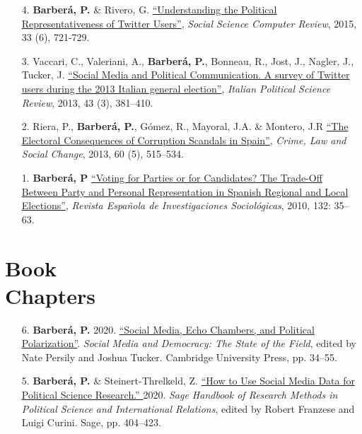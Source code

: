 \documentclass[margin,line,11pt]{resume}
\begin{document}
\begin{resume}
\begin{itemize}[leftmargin=5.5mm]
\item[4.] \textbf{Barber\'{a}, P.} \& Rivero, G. \href{http://ssc.sagepub.com/content/33/6/712}{``Understanding the Political Representativeness of Twitter Users''}, \textit{Social Science Computer Review}, 2015, 33 (6), 721-729.

\newpage 

\item[3.] Vaccari, C., Valeriani, A., \textbf{Barber\'{a}, P.}, Bonneau, R., Jost, J., Nagler, J., Tucker, J. \href{http://www.rivisteweb.it/doi/10.1426/75245}{``Social Media and Political Communication. A survey of Twitter users during the 2013 Italian general election''}, \emph{Italian Political Science Review}, 2013, 43 (3), 381--410.

\item[2.] Riera, P., \textbf{Barber\'{a}, P.}, G\'{o}mez, R., Mayoral, J.A. \& Montero, J.R \href{http://link.springer.com/article/10.1007/s10611-013-9479-1}{``The Electoral Consequences of Corruption Scandals in Spain''}, \emph{Crime, Law and Social Change}, 2013, 60 (5), 515--534.

\item[1.] \textbf{Barber\'{a}, P} \href{http://www.reis.cis.es/REIS/PDF/REIS_132_021285919804928.pdf}{``Voting for Parties or for Candidates? The Trade-Off Between Party and Personal Representation in Spanish Regional and Local Elections''}, \emph{Revista Espa\~{n}ola de Investigaciones Sociol\'{o}gicas}, 2010, 132: 35--63.

\end{itemize}    



\section{\mysidestyle Book\\Chapters} 
\vspace{.15cm}    
\begin{itemize}[leftmargin=5.5mm]
\item[6.] \textbf{Barber\'{a}, P.} 2020. \href{http://www.pablobarbera.com/static/echo-chambers.pdf}{``Social Media, Echo Chambers, and Political Polarization''}. \textit{Social Media and Democracy: The State of the Field}, edited by Nate Persily and Joshua Tucker. Cambridge University Press, pp. 34--55.

\item[5.] \textbf{Barber\'{a}, P.} \& Steinert-Threlkeld, Z. \href{http://www.pablobarbera.com/static/social-media-data-generators.pdf}{``How to Use Social Media Data for Political Science Research.'' } 2020. \textit{Sage Handbook of Research Methods in Political Science and International Relations}, edited by Robert Franzese and Luigi Curini. Sage, pp. 404--423.


\end{itemize}
\end{resume}
\end{document}
